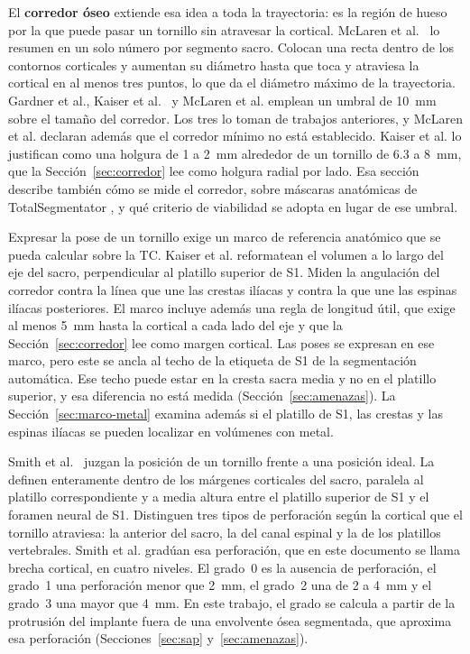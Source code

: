 El \textbf{corredor óseo} extiende esa idea a toda la trayectoria: es la región de hueso por la que puede pasar un tornillo sin atravesar la cortical. McLaren et al.~\cite{mclaren2021corridor} lo resumen en un solo número por segmento sacro. Colocan una recta dentro de los contornos corticales y aumentan su diámetro hasta que toca y atraviesa la cortical en al menos tres puntos, lo que da el diámetro máximo de la trayectoria. Gardner et al., Kaiser et al.~\cite{kaiser2014dysmorphism} y McLaren et al. emplean un umbral de 10~mm sobre el tamaño del corredor. Los tres lo toman de trabajos anteriores, y McLaren et al. declaran además que el corredor mínimo no está establecido. Kaiser et al. lo justifican como una holgura de 1 a 2~mm alrededor de un tornillo de 6.3 a 8~mm, que la Sección~\ref{sec:corredor} lee como holgura radial por lado. Esa sección describe también cómo se mide el corredor, sobre máscaras anatómicas de TotalSegmentator \cite{wasserthal2023}, y qué criterio de viabilidad se adopta en lugar de ese umbral.

Expresar la pose de un tornillo exige un marco de referencia anatómico que se pueda calcular sobre la TC. Kaiser et al. reformatean el volumen a lo largo del eje del sacro, perpendicular al platillo superior de S1. Miden la angulación del corredor contra la línea que une las crestas ilíacas y contra la que une las espinas ilíacas posteriores. El marco incluye además una regla de longitud útil, que exige al menos 5~mm hasta la cortical a cada lado del eje y que la Sección~\ref{sec:corredor} lee como margen cortical. Las poses se expresan en ese marco, pero este se ancla al techo de la etiqueta de S1 de la segmentación automática. Ese techo puede estar en la cresta sacra media y no en el platillo superior, y esa diferencia no está medida (Sección~\ref{sec:amenazas}). La Sección~\ref{sec:marco-metal} examina además si el platillo de S1, las crestas y las espinas ilíacas se pueden localizar en volúmenes con metal.

Smith et al.~\cite{smith2006iliosacral} juzgan la posición de un tornillo frente a una posición ideal. La definen enteramente dentro de los márgenes corticales del sacro, paralela al platillo correspondiente y a media altura entre el platillo superior de S1 y el foramen neural de S1. Distinguen tres tipos de perforación según la cortical que el tornillo atraviesa: la anterior del sacro, la del canal espinal y la de los platillos vertebrales. Smith et al. gradúan esa perforación, que en este documento se llama brecha cortical, en cuatro niveles. El grado~0 es la ausencia de perforación, el grado~1 una perforación menor que 2~mm, el grado~2 una de 2 a 4~mm y el grado~3 una mayor que 4~mm. En este trabajo, el grado se calcula a partir de la protrusión del implante fuera de una envolvente ósea segmentada, que aproxima esa perforación (Secciones~\ref{sec:sap} y~\ref{sec:amenazas}).

